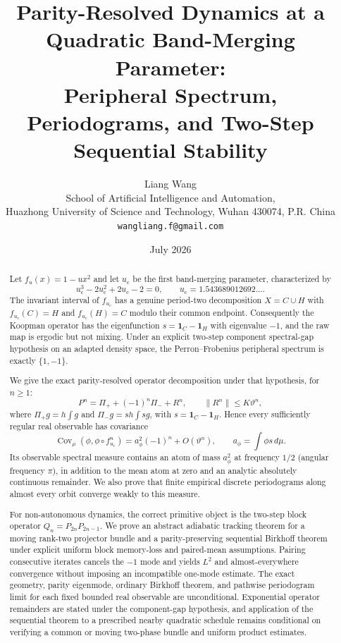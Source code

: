 \documentclass[11pt]{article}
\title{\textbf{Parity-Resolved Dynamics at a Quadratic Band-Merging Parameter:}\\
Peripheral Spectrum, Periodograms, and Two-Step Sequential Stability}
\author{Liang Wang\\
\small School of Artificial Intelligence and Automation,\\[-0.2em]
\small Huazhong University of Science and Technology, Wuhan 430074, P.R. China\\
\small \texttt{wangliang.f@gmail.com}}
\date{July 2026}
\theoremstyle{definition}
\theoremstyle{remark}
\newcommand{\uc}{u_{\mathrm c}}
\newcommand{\one}{\mathbf 1}
\newcommand{\Cov}{\operatorname{Cov}}
\begin{document}
\maketitle

\begin{abstract}
Let $f_u(x)=1-u x^2$ and let $\uc$ be the first band-merging parameter, characterized by
\[
    \uc^3-2\uc^2+2\uc-2=0,
    \qquad \uc=1.543689012692\ldots.
\]
The invariant interval of $f_{\uc}$ has a genuine period-two decomposition $X=C\cup H$ with $f_{\uc}(C)=H$ and $f_{\uc}(H)=C$ modulo their common endpoint.  Consequently the Koopman operator has the eigenfunction $s=\one_C-\one_H$ with eigenvalue $-1$, and the raw map is ergodic but not mixing.  Under an explicit two-step component spectral-gap hypothesis on an adapted density space, the Perron--Frobenius peripheral spectrum is exactly $\{1,-1\}$.

We give the exact parity-resolved operator decomposition under that hypothesis, for $n\ge1$:
\[
    P^n=\Pi_+ +(-1)^n\Pi_-+R^n,
    \qquad \|R^n\|\le K\vartheta^n,
\]
where $\Pi_+g=h\int g$ and $\Pi_-g=sh\int sg$, with $s=\one_C-\one_H$.  Hence every sufficiently regular real observable has covariance
\[
    \Cov_\mu(\phi,\phi\circ f_{\uc}^n)
    =a_\phi^2(-1)^n+O(\vartheta^n),
    \qquad a_\phi=\int\phi s\,d\mu.
\]
Its observable spectral measure contains an atom of mass $a_\phi^2$ at frequency $1/2$ (angular frequency $\pi$), in addition to the mean atom at zero and an analytic absolutely continuous remainder.  We also prove that finite empirical discrete periodograms along almost every orbit converge weakly to this measure.

For non-autonomous dynamics, the correct primitive object is the two-step block operator $Q_n=P_{2n}P_{2n-1}$.  We prove an abstract adiabatic tracking theorem for a moving rank-two projector bundle and a parity-preserving sequential Birkhoff theorem under explicit uniform block memory-loss and paired-mean assumptions.  Pairing consecutive iterates cancels the $-1$ mode and yields $L^2$ and almost-everywhere convergence without imposing an incompatible one-mode estimate.  The exact geometry, parity eigenmode, ordinary Birkhoff theorem, and pathwise periodogram limit for each fixed bounded real observable are unconditional.  Exponential operator remainders are stated under the component-gap hypothesis, and application of the sequential theorem to a prescribed nearby quadratic schedule remains conditional on verifying a common or moving two-phase bundle and uniform product estimates.
\end{abstract}
\end{document}
